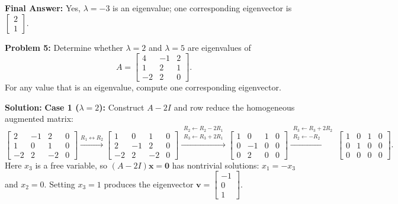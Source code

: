 \documentclass[11pt, letterpaper]{article}
\theoremstyle{definition}
\theoremstyle{remark}
\begin{document}
\textbf{Final Answer:} Yes, $\lambda = -3$ is an eigenvalue; one corresponding eigenvector is $\begin{bmatrix} 2 \\ 1 \end{bmatrix}$.

\vspace{0.4em}
\textbf{Problem 5:}
Determine whether $\lambda = 2$ and $\lambda = 5$ are eigenvalues of
\[
A = \begin{bmatrix} 4 & -1 & 2 \\ 1 & 2 & 1 \\ -2 & 2 & 0 \end{bmatrix}.
\]
For any value that is an eigenvalue, compute one corresponding eigenvector.

\textbf{Solution:}
\textbf{Case 1 ($\lambda = 2$):} Construct $A - 2I$ and row reduce the homogeneous augmented matrix:
\[
\begin{bmatrix} 2 & -1 & 2 & 0 \\ 1 & 0 & 1 & 0 \\ -2 & 2 & -2 & 0 \end{bmatrix}
\xrightarrow{R_1 \leftrightarrow R_2}
\begin{bmatrix} 1 & 0 & 1 & 0 \\ 2 & -1 & 2 & 0 \\ -2 & 2 & -2 & 0 \end{bmatrix}
\xrightarrow{\substack{R_2 \leftarrow R_2 - 2R_1 \\ R_3 \leftarrow R_3 + 2R_1}}
\begin{bmatrix} 1 & 0 & 1 & 0 \\ 0 & -1 & 0 & 0 \\ 0 & 2 & 0 & 0 \end{bmatrix}
\xrightarrow{\substack{R_3 \leftarrow R_3 + 2R_2 \\ R_2 \leftarrow -R_2}}
\begin{bmatrix} 1 & 0 & 1 & 0 \\ 0 & 1 & 0 & 0 \\ 0 & 0 & 0 & 0 \end{bmatrix}.
\]
Here $x_3$ is a free variable, so $(A - 2I)\mathbf{x} = \mathbf{0}$ has nontrivial solutions: $x_1 = -x_3$ and $x_2 = 0$. Setting $x_3 = 1$ produces the eigenvector $\mathbf{v} = \begin{bmatrix} -1 \\ 0 \\ 1 \end{bmatrix}$.
\end{document}
